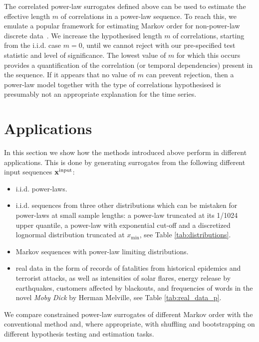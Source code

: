 \documentclass[%
prx,
reprint,
superscriptaddress,
nofootinbib,
 amsmath,amssymb,
 aps,
floatfix,
]{revtex4-2}
\newcommand{\xin}{{{\bf x}^{\text{input}}}}
\begin{document}
The correlated power-law surrogates defined above can be used to estimate the effective length $m$ of correlations in a power-law sequence. To reach this, we emulate a popular framework for estimating Markov order for non-power-law discrete data~\cite{van1998testing,pethel2014exact,correa2020constrained}. We increase the hypothesised length $m$ of correlations, starting from the i.i.d. case $m = 0$, until we cannot reject with our pre-specified test statistic and level of significance. The lowest value of $m$ for which this occurs provides a quantification of the correlation (or temporal dependencies) present in the sequence. If it appears that no value of $m$ can prevent rejection, then a power-law model together with the type of correlations hypothesised is presumably not an appropriate explanation for the time series.

\color{black}%

\section{Applications}

In this section we show how the methods introduced above perform in different applications. This is done by generating surrogates from the following different input sequences $\xin$:
%
\begin{itemize}
\item i.i.d. power-laws.
\item i.i.d. sequences from three other distributions which can be mistaken for power-laws at small sample lengths: a power-law truncated at its 1/1024 upper quantile, a power-law with exponential cut-off and a discretized lognormal distribution truncated at $x_{\min}$, see Table \ref{tab:distributions}. 
\item Markov sequences with power-law limiting distributions. 
\item real data in the form of records of fatalities from historical epidemics and terrorist attacks, as well as intensities of solar flares, energy release by earthquakes, customers affected by blackouts, and frequencies of words in the novel \emph{Moby Dick} by Herman Melville, see Table \ref{tab:real_data_p}. 
\end{itemize}
%
We compare constrained power-law surrogates of different Markov order with the conventional method and, where appropriate, with shuffling and bootstrapping on different hypothesis testing and estimation tasks. 
\end{document}
